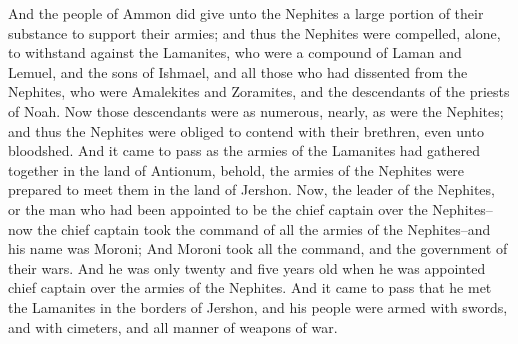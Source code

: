 And the people of Ammon did give unto the Nephites a large portion of their substance to support their armies; and thus the Nephites were compelled, alone, to withstand against the Lamanites, who were a compound of Laman and Lemuel, and the sons of Ishmael, and all those who had dissented from the Nephites, who were Amalekites and Zoramites, and the descendants of the priests of Noah.
\bverse \iffalse Now those descendants were as numerous, nearly, as were the Nephites; and thus the Nephites were obliged to contend with their brethren, even unto bloodshed. \fi
Now those descendants were as numerous, nearly, as were the Nephites; and thus the Nephites were obliged to contend with their brethren, even unto bloodshed.
\bverse \iffalse And it came to pass as the armies of the Lamanites had gathered together in the land of Antionum, behold, the armies of the Nephites were prepared to meet them in the land of Jershon. \fi
And it came to pass as the armies of the Lamanites had gathered together in the land of Antionum, behold, the armies of the Nephites were prepared to meet them in the land of Jershon.
\bverse \iffalse Now, the leader of the Nephites, or the man who had been appointed to be the chief captain over the Nephites--now the chief captain took the command of all the armies of the Nephites--and his name was Moroni; \fi
Now, the leader of the Nephites, or the man who had been appointed to be the chief captain over the Nephites--now the chief captain took the command of all the armies of the Nephites--and his name was Moroni;
\bverse \iffalse And Moroni took all the command, and the government of their wars. And he was only twenty and five years old when he was appointed chief captain over the armies of the Nephites. \fi
And Moroni took all the command, and the government of their wars. And he was only twenty and five years old when he was appointed chief captain over the armies of the Nephites.
\bverse \iffalse And it came to pass that he met the Lamanites in the borders of Jershon, and his people were armed with swords, and with cimeters, and all manner of weapons of war. \fi
And it came to pass that he met the Lamanites in the borders of Jershon, and his people were armed with swords, and with cimeters, and all manner of weapons of war.
\bverse \iffalse And when the armies of the Lamanites saw that the people of Nephi, or that Moroni, had prepared his people with breastplates and with arm-shields, yea, and also shields to defend their heads, and also they were dressed with thick clothing-- \fi
